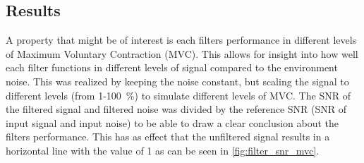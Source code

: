 \subsection{Results}
A property that might be of interest is each filters performance in different levels of Maximum Voluntary Contraction (MVC). This allows for insight into how well each filter functions in different levels of signal compared to the environment noise. This was realized by keeping the noise constant, but scaling the signal to different levels (from 1-\SI{100}{\percent}) to simulate different levels of MVC. The SNR of the filtered signal and filtered noise was divided by the reference SNR (SNR of input signal and input noise) to be able to draw a clear conclusion about the filters performance. This has as effect that the unfiltered signal results in a horizontal line with the value of 1 as can be seen in \ref{fig:filter_snr_mvc}.

